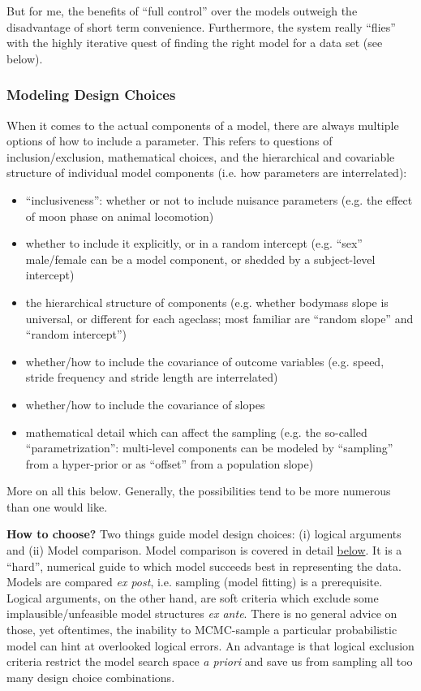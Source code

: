 But for me, the benefits of ``full control'' over the models outweigh the disadvantage of short term convenience.
Furthermore, the system really ``flies'' with the highly iterative quest of finding the right model for a data set (see below).


\subsubsection{Modeling Design Choices}
\label{workflow:design:philosophy}
When it comes to the actual components of a model, there are always multiple options of how to include a parameter.
This refers to questions of inclusion/exclusion, mathematical choices, and the hierarchical and covariable structure of individual model components (i.e. how parameters are interrelated):
\begin{itemize}
\item ``inclusiveness'': whether or not to include nuisance parameters (e.g. the effect of moon phase on animal locomotion)
\item whether to include it explicitly, or in a random intercept (e.g. ``sex'' male/female can be a model component, or shedded by a subject-level intercept)
\item the hierarchical structure of components (e.g. whether bodymass slope is universal, or different for each ageclass; most familiar are ``random slope'' and ``random intercept'')
\item whether/how to include the covariance of outcome variables (e.g. speed, stride frequency and stride length are interrelated)
\item whether/how to include the covariance of slopes
\item mathematical detail which can affect the sampling (e.g. the so-called ``parametrization'': multi-level components can be modeled by ``sampling'' from a hyper-prior or as ``offset'' from a population slope)
\end{itemize}

More on all this below.
Generally, the possibilities tend to be more numerous than one would like.

\textbf{How to choose?} Two things guide model design choices: (i) logical arguments and (ii) Model comparison.
Model comparison is covered in detail \hyperref[workflow:comparison]{below}.
It is a ``hard'', numerical guide to which model succeeds best in representing the data.
Models are compared \emph{ex post}, i.e. sampling (model fitting) is a prerequisite.
Logical arguments, on the other hand, are soft criteria which exclude some implausible/unfeasible model structures \emph{ex ante}.
There is no general advice on those, yet oftentimes, the inability to MCMC-sample a particular probabilistic model can hint at overlooked logical errors.
An advantage is that logical exclusion criteria restrict the model search space \emph{a priori} and save us from sampling all too many design choice combinations.


